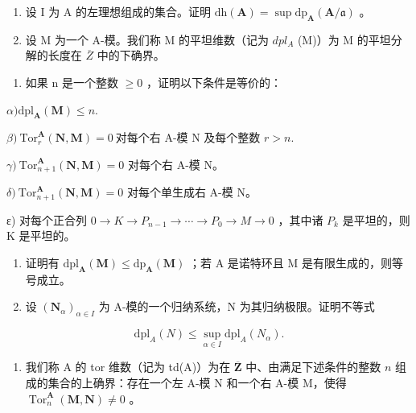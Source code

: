 \begin{enumerate}
\def\labelenumi{\arabic{enumi})}
\setcounter{enumi}{5}
\item
  设 I 为 A 的左理想组成的集合。证明 \(\mathrm{dh}(\mathbf{A}) = \sup \mathrm{dp}_{\mathbf{A}}(\mathbf{A}/\mathfrak{a})\) 。
\item
  设 M 为一个 A-模。我们称 M 的平坦维数（记为 \(dpl_{A}\) (M)）为 M 的平坦分解的长度在 \(\overline{Z}\) 中的下确界。
\end{enumerate}

\begin{enumerate}
\def\labelenumi{\alph{enumi})}
\tightlist
\item
  如果 n 是一个整数 \(\geqslant 0\) ，证明以下条件是等价的：
\end{enumerate}

\(\alpha)\mathrm{dpl}_{\mathbf{A}}(\mathbf{M})\leqslant n.\)

\(\beta)\ \mathrm{Tor}_{r}^{\mathbf{A}}(\mathbf{N},\mathbf{M})=0\ \text{对每个右 A-模 N 及每个整数 }r>n.\)

\(\gamma)\ \mathrm{Tor}_{n+1}^{\mathbf{A}}(\mathbf{N},\mathbf{M})=0\) 对每个右 A-模 N。

\(\delta)\ \mathrm{Tor}_{n+1}^{\mathbf{A}}(\mathbf{N},\mathbf{M})=0\) 对每个单生成右 A-模 N。

ε) 对每个正合列 \(0 \rightarrow K \rightarrow P_{n-1} \rightarrow \cdots \rightarrow P_{0} \rightarrow M \rightarrow 0\) ，其中诸 \(P_{k}\) 是平坦的，则 K 是平坦的。

\begin{enumerate}
\def\labelenumi{\alph{enumi})}
\setcounter{enumi}{1}
\item
  证明有 \(\mathrm{dpl}_{\mathbf{A}}(\mathbf{M}) \leqslant \mathrm{dp}_{\mathbf{A}}(\mathbf{M})\) ；若 A 是诺特环且 M 是有限生成的，则等号成立。
\item
  设 \((\mathbf{N}_{\alpha})_{\alpha \in I}\) 为 A-模的一个归纳系统，N 为其归纳极限。证明不等式
\end{enumerate}

\[
\mathrm{dpl} _ {A} (N) \leqslant \sup _ {\alpha \in I} \mathrm{dpl} _ {A} (N _ {\alpha}).
\]

\begin{enumerate}
\def\labelenumi{\arabic{enumi})}
\setcounter{enumi}{7}
\tightlist
\item
  我们称 A 的 tor 维数（记为 td(A)）为在 \(\overline{\mathbf{Z}}\) 中、由满足下述条件的整数 \(n\) 组成的集合的上确界：存在一个左 A-模 N 和一个右 A-模 M，使得 \(\operatorname{Tor}_{n}^{\mathbf{A}}(\mathbf{M},\mathbf{N})\neq0\) 。
\end{enumerate}

